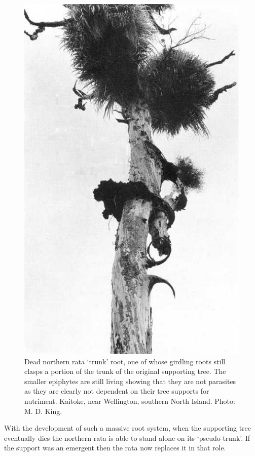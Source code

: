 \begin{figure}[!htb]
\begin{minipage}[t]{0.455\textwidth}
    	\includegraphics[width=\textwidth]{graphics/figure53dead-rata.jpg}
    	\caption[Dead northern rata `trunk' root]{Dead northern rata `trunk' root, one of whose girdling roots still clasps a portion of the trunk of the original supporting tree.
    	The smaller epiphytes are still living showing that they are not parasites as they are clearly not dependent on their tree supports for nutriment.
    	Kaitoke, near Wellington, southern North Island.
    	Photo: M. D. King.}%
    	\label{fig:53dead-rata}
	\end{minipage}
\end{figure}

With the development of such a massive root system, when the supporting tree eventually dies the northern rata is able to stand alone on its `pseudo-trunk'.
If the support was an emergent then the rata now replaces it in that role.

